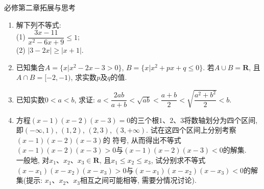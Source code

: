 \documentclass[10pt,a4paper]{article}
\begin{document}
必修第二章拓展与思考
\begin{enumerate}[1.]

\item 解下列不等式:\\
(1) $\dfrac{3x-11}{x^2-6x+9}\le 1$;\\
(2) $|3-2x| \ge |x+1|$.
\vspace*{3cm}
\item 已知集合$A=\{x|x^2-2x-3>0\}$, $B=\{x|x^2+px+q\le 0\}$. 若$A\cup B=\mathbf{R}$, 且$A\cap B=[-2,-1)$, 求实数$p$及$q$的值.
\vspace*{3cm}
\item 已知实数$0<a<b$, 求证: $a<\dfrac{2ab}{a+b}<\sqrt{ab}<\dfrac{a+b}{2}<\sqrt{\dfrac{a^2+b^2}{2}}<b$.
\vspace*{3cm}
\item 方程$(x-1)(x-2)(x-3)=0$的三个根$1$、$2$、$3$将数轴划分为四个区间, 即$(-\infty, 1)$, $(1, 2)$, $(2, 3)$, $(3, +\infty)$. 试在这四个区间上分别考察$(x-1)(x-2)(x-3)$的
符号, 从而得出不等式$(x-1)(x-2)(x-3)>0$与$(x-1)(x-2)(x-3)<0$的解集.\\
一般地, 对$x_1$、$x_2$、$x_3\in \mathbf{R}$, 且$x_1\le x_2\le x_3$, 试分别求不等式$(x-x_1)(x-x_2)(x-x_3)>0$与$(x-x_1)(x-x_2)(x-x_3)<0$的解集(提示: $x_1$、$x_2$、$x_3$相互之间可能相等, 需要分情况讨论).
\vspace*{3cm}
\end{enumerate}
\end{document}
